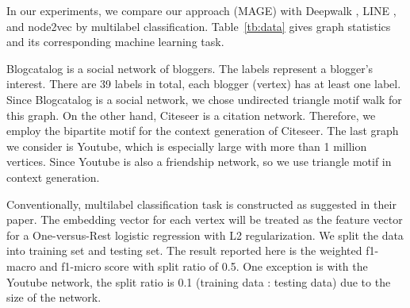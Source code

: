 \documentclass[letterpaper]{article}
\begin{document}
            In our experiments, we compare our approach (MAGE) with Deepwalk \cite{deepwalk}, 
            LINE \cite{line}, and node2vec \cite{node2vec} by multilabel classification. 
            Table~\ref{tb:data} gives graph statistics and its corresponding machine learning task. 

            \begin{table}
                \centering
                \caption{Dataset statistics}
                \label{tb:data}
            \end{table}

            Blogcatalog \cite{blogcatalog} is a social network of bloggers. The labels represent
            a blogger's interest. There are 39 labels in total, each blogger (vertex) has at least
            one label. Since Blogcatalog is a social network, we chose undirected triangle motif
            walk for this graph. On the other hand, Citeseer \cite{planetoid} 
            is a citation network. Therefore, we employ the bipartite motif for the context generation
            of Citeseer. The last graph we consider is Youtube, which is especially
            large with more than 1 million vertices. Since Youtube is also a friendship network,
            so we use triangle motif in context generation.

            Conventionally, multilabel classification task is constructed as \citeauthor{deepwalk} suggested
            in their paper. The embedding vector for each vertex will be treated as the feature
            vector for a One-versus-Rest logistic regression with L2 regularization. We split the 
            data into training set and testing set. The result reported here is the weighted f1-macro and
            f1-micro score with split ratio of 0.5. One exception is with the Youtube network, the
            split ratio is 0.1 (training data : testing data) due to the size of the network.
\end{document}
